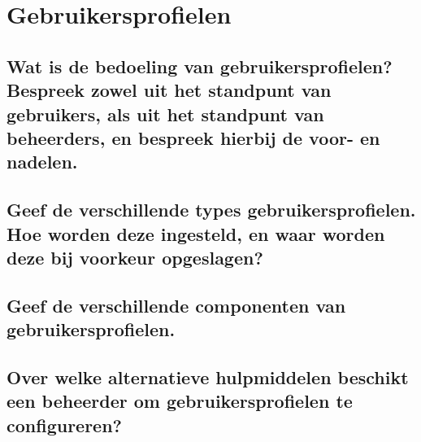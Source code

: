 \chapter{Gebruikersprofielen}

\section{Wat is de bedoeling van gebruikersprofielen? Bespreek zowel uit het
standpunt van gebruikers, als uit het standpunt van beheerders, en bespreek
hierbij de voor- en nadelen.}

\section{Geef de verschillende types gebruikersprofielen. Hoe worden deze
ingesteld, en waar worden deze bij voorkeur opgeslagen?}

\section{Geef de verschillende componenten van gebruikersprofielen.}

\section{Over welke alternatieve hulpmiddelen beschikt een beheerder om
gebruikersprofielen te configureren?}
